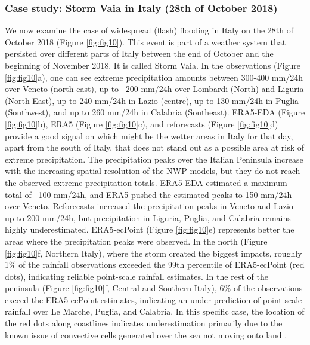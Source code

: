 \documentclass{ametsocV6.1}
\begin{document}
\subsubsection{Case study: Storm Vaia in Italy (28th of October 2018)}

We now examine the case of widespread (flash) flooding in Italy on the 28th of October 2018 (Figure \ref{fig:fig10}). This event is part of a weather system that persisted over different parts of Italy between the end of October and the beginning of November 2018. It is called Storm Vaia. In the observations (Figure \ref{fig:fig10}a), one can see extreme precipitation amounts between 300-400 mm/24h over Veneto (north-east), up to ~200 mm/24h over Lombardi (North) and Liguria (North-East), up to 240 mm/24h in Lazio (centre), up to 130 mm/24h in Puglia (Southwest), and up to 260 mm/24h in Calabria (Southeast). ERA5-EDA (Figure \ref{fig:fig10}b), ERA5 (Figure \ref{fig:fig10}c), and reforecasts (Figure \ref{fig:fig10}d) provide a good signal on which might be the wetter areas in Italy for that day, apart from the south of Italy, that does not stand out as a possible area at risk of extreme precipitation. The precipitation peaks over the Italian Peninsula increase with the increasing spatial resolution of the NWP models, but they do not reach the observed extreme precipitation totals. ERA5-EDA estimated a maximum total of ~100 mm/24h, and ERA5 pushed the estimated peaks to 150 mm/24h over Veneto. Reforecasts increased the precipitation peaks in Veneto and Lazio up to 200 mm/24h, but precipitation in Liguria, Puglia, and Calabria remains highly underestimated. ERA5-ecPoint (Figure \ref{fig:fig10}e) represents better the areas where the precipitation peaks were observed. In the north (Figure \ref{fig:fig10}f, Northern Italy), where the storm created the biggest impacts, roughly 1\% of the rainfall observations exceeded the 99th percentile of ERA5-ecPoint (red dots), indicating reliable point-scale rainfall estimates. In the rest of the peninsula (Figure \ref{fig:fig10}f, Central and Southern Italy), 6\% of the observations exceed the ERA5-ecPoint estimates, indicating an under-prediction of point-scale rainfall over Le Marche, Puglia, and Calabria. In this specific case, the location of the red dots along coastlines indicates underestimation primarily due to the known issue of convective cells generated over the sea not moving onto land \citep{Bechtold2014}.
\end{document}
